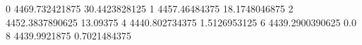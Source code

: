 0 4469.732421875 30.4423828125
1 4457.46484375 18.1748046875
2 4452.3837890625 13.09375
4 4440.802734375 1.5126953125
6 4439.2900390625 0.0
8 4439.9921875 0.7021484375
